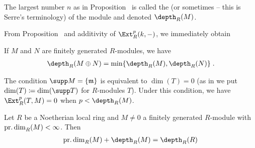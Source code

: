 \documentclass[a4paper,parskip=half,numbers=enddot, DIV=12]{scrreprt}
\begin{document}
\begin{defi}
	The largest number $n$ as in Proposition~ is called the  (or sometimes  -- this is Serre's terminology) of the module and denoted $\depth_R(M)$.
\end{defi}
From Proposition~ and additivity of $\Ext_R^p(k,-)$, we immediately obtain
\begin{fact}
	If $M$ and $N$ are finitely generated $R$-modules, we have 
	\begin{align*}
		\depth_R(M\oplus N)=\min\{\depth_R(M),\depth_R(N)\}\;.
	\end{align*}
\end{fact}
\begin{rem}
	The condition $\supp M=\{\mm\}$ is equivalent to $\dim (T)=0$ (as in \cite[Definition~3.4.1]{alg2} we put $\dim(T)\coloneqq\dim(\supp T)$ for $R$-modules $T$). Under this condition, we have $\Ext_R^p(T,M)=0$ when $p<\depth_R(M)$.
\end{rem}
\begin{thm}
	Let $R$ be a Noetherian local ring and $M\neq 0$ a finitely generated $R$-module with $\operatorname{pr.dim}_R(M)<\infty$. Then
	\begin{align}\lbl{eq:AuslanderBuchsbaum}
		\pdim_R(M)+\depth_R(M)=\depth_R(R)
	\end{align}
\end{thm}
\end{document}
